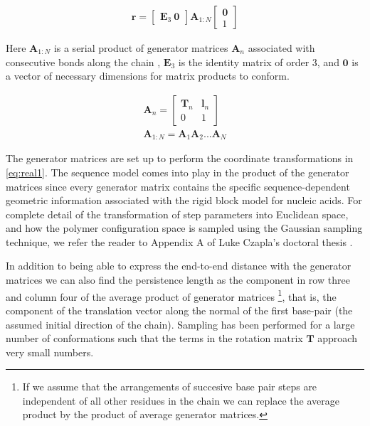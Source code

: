 \begin{gather}
\mathbf{r}= \begin{bmatrix}\mathbf{E}_{3}~ \mathbf{0} \end{bmatrix} \mathbf{A}_{1:N}\begin{bmatrix} \mathbf{0} \\ 1 \end{bmatrix}
\end{gather}

Here $\mathbf{A}_{1:N}$ is a serial product of generator matrices
$\mathbf{A}_{n}$ associated with consecutive bonds along the chain \cite{flory1969, maroun1988a, marky1994a},
$\mathbf{E}_{3}$  is the  identity matrix  of order  3, and  $\mathbf{0}$  is a
vector of necessary dimensions for matrix products to conform.

\begin{gather}
\mathbf{A}_{n} =
\begin{bmatrix}
\mathbf{T}_{n} & \mathbf{l}_{n} \\
0 & 1
\end{bmatrix}\\
\mathbf{A}_{1:N}=\mathbf{A}_{1}\mathbf{A}_{2}...\mathbf{A}_{N}
\end{gather}

The  generator   matrices  are  set  up  to   perform  the  coordinate
transformations in \ref{eq:real1}. The  sequence model comes into play
in the product of the  generator matrices since every generator matrix
contains   the  specific   sequence-dependent   geometric  information
associated with the rigid block model for nucleic acids.  For complete
detail of the transformation  of step parameters into Euclidean space,
and how the polymer configuration  space is sampled using the Gaussian
sampling technique, we refer the reader to Appendix A of Luke Czapla's
doctoral thesis \cite{czapla2009}.

In addition to being able  to express the end-to-end distance with the
generator  matrices we  can also  find the  persistence length  as the
component  in row  three and  column four  of the  average  product of
generator  matrices \footnote{If  we assume  that the  arrangements of
  succesive base pair  steps are independent of all  other residues in
  the  chain we  can replace  the average  product by  the  product of
  average  generator  matrices.},  that   is,  the  component  of  the
translation  vector  along the  normal  of  the  first base-pair  (the
assumed initial  direction of the chain). Sampling  has been performed
for  a  large number  of  conformations such  that  the  terms in  the
rotation matrix $\mathbf{T}$ approach very small numbers.

